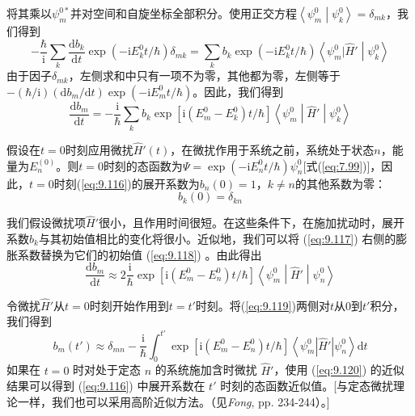     将其乘以$\psi_m^{0\ast}$并对空间和自旋坐标全部积分。使用正交方程$\left\langle \psi_m^0 \middle| \psi_k^0 \right\rangle = \delta_{mk}$，我们得到
    \begin{equation*}
        -\frac{\hbar}{\mathrm{i}}\sum_k\frac{\mathrm{d}b_k}{\mathrm{d}t}\exp\left(-\mathrm{i}E_k^0t/\hbar\right)\delta_{mk} = \sum_kb_k\exp\left(-\mathrm{i}E_k^0t/\hbar\right)\left\langle\psi_m^0|\hat{H}'\middle|\psi_k^0\right\rangle
    \end{equation*}
    由于因子$\delta_{mk}$，左侧求和中只有一项不为零，其他都为零，左侧等于$-\left(\hbar/\mathrm{i}\right) \left(\mathrm{d} b_m/\mathrm{d}t\right) \exp\left(-\mathrm{i}E_m^0t/\hbar\right)$。因此，我们得到
    \begin{equation}
        \frac{\mathrm{d}b_m}{\mathrm{d}t} = -\frac{\mathrm{i}}{\hbar}\sum_k b_k\exp\left[\mathrm{i}(E_m^0-E_k^0)t/\hbar\right]\left\langle\psi_m^0\middle|\hat{H}'\middle|\psi_k^0\right\rangle
        \label{eq:9.117}
    \end{equation}

    假设在$t=0$时刻应用微扰$\hat{H}'\left(t\right)$，在微扰作用于系统之前，系统处于状态$n$，能量为$E_n^{\left(0\right)}$。则$t=0$时刻的态函数为$\Psi = \exp{(-\mathrm{i}E_n^0t/\hbar)}\psi_n^0$[式(\ref{eq:7.99})]，因此，$t=0$时刻(\ref{eq:9.116})的展开系数为$b_n\left(0\right) = 1$，$k \neq n$的其他系数为零：
    \begin{equation}
        b_k\left(0\right) = \delta_{kn}
        \label{eq:9.118}
    \end{equation}

    我们假设微扰项$\hat{H}'$很小，且作用时间很短。在这些条件下，在施加扰动时，展开系数$b_k$与其初始值相比的变化将很小。近似地，我们可以将 (\ref{eq:9.117}) 右侧的膨胀系数替换为它们的初始值 (\ref{eq:9.118}) 。由此得出
    \begin{equation}
        \frac{\mathrm{d}b_m}{\mathrm{d}t} \approx 2\frac{\mathrm{i}}{\hbar}\exp\left[\mathrm{i}\left(E_m^0-E_n^0\right)t/\hbar\right]\left\langle\psi_m^0\middle|\hat{H}'\middle|\psi_n^0\right\rangle
        \label{eq:9.119}
    \end{equation}

    令微扰$\hat{H}'$从$t=0$时刻开始作用到$t=t'$时刻。将(\ref{eq:9.119})两侧对$t$从$0$到$t'$积分，我们得到
    \begin{equation}
        b_{m}\left(t'\right) \approx \delta_{m n}-\frac{\mathrm{i}}{\hbar}\int_{0}^{t'} \exp\left[\mathrm{i}\left(E_{m}^{0}-E_{n}^{0}\right)t/\hbar\right]\left\langle\psi_{m}^{0}\left|\hat{H}'\right| \psi_{n}^{0}\right\rangle \mathrm{d} t
        \label{eq:9.120}
    \end{equation}
    如果在 $t=0$ 时对处于定态 $n$ 的系统施加含时微扰 $\hat{H}'$，使用 (\ref{eq:9.120}) 的近似结果可以得到 (\ref{eq:9.116}) 中展开系数在 $t'$ 时刻的态函数近似值。[与定态微扰理论一样，我们也可以采用高阶近似方法。（见\textit{Fong}, pp. 234-244）。]

